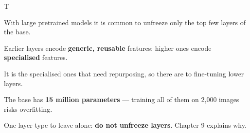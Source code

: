 \documentclass[aspectratio=169,11pt,t]{beamer}
\begin{document}
\begin{frame}{T}
{\fontsize{9.4}{12.6}\selectfont\color{fg2}With large pretrained models it is common to unfreeze only the top few layers of the base.\par}\vskip 4pt
\begin{minipage}[t]{0.485\textwidth}
\begin{ibullets}
\item Earlier layers encode \textbf{generic, reusable} features; higher ones encode \textbf{specialised} features.
\item It is the specialised ones that need repurposing, so there are  to fine-tuning lower layers.
\item The base has \textbf{15 million parameters} --- training all of them on 2,000 images risks overfitting.
\end{ibullets}

\end{minipage}%
\hfill
\begin{minipage}[t]{0.485\textwidth}

\end{minipage}%
\begin{iband}[amber]
One layer type to leave alone: \textbf{do not unfreeze  layers}. Chapter 9 explains why.
\end{iband}
\end{frame}
\end{document}
